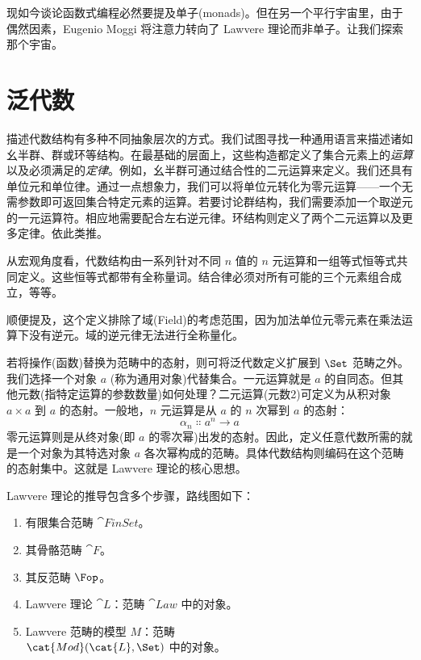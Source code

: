 
\lettrine[lhang=0.17]{现}{如今}谈论函数式编程必然要提及单子(monads)。但在另一个平行宇宙里，由于偶然因素，Eugenio Moggi 将注意力转向了 Lawvere 理论而非单子。让我们探索那个宇宙。

\section{泛代数}

描述代数结构有多种不同抽象层次的方式。我们试图寻找一种通用语言来描述诸如幺半群、群或环等结构。在最基础的层面上，这些构造都定义了集合元素上的\emph{运算}以及必须满足的\emph{定律}。例如，幺半群可通过结合性的二元运算来定义。我们还具有单位元和单位律。通过一点想象力，我们可以将单位元转化为零元运算——一个无需参数即可返回集合特定元素的运算。若要讨论群结构，我们需要添加一个取逆元的一元运算符。相应地需要配合左右逆元律。环结构则定义了两个二元运算以及更多定律。依此类推。

从宏观角度看，代数结构由一系列针对不同 $n$ 值的 $n$ 元运算和一组等式恒等式共同定义。这些恒等式都带有全称量词。结合律必须对所有可能的三个元素组合成立，等等。

顺便提及，这个定义排除了域(Field)的考虑范围，因为加法单位元零元素在乘法运算下没有逆元。域的逆元律无法进行全称量化。

若将操作(函数)替换为范畴中的态射，则可将泛代数定义扩展到 $\Set$ 范畴之外。我们选择一个对象 $a$ (称为通用对象)代替集合。一元运算就是 $a$ 的自同态。但其他元数(指特定运算的参数数量)如何处理？二元运算(元数2)可定义为从积对象 $a\times{}a$ 到 $a$ 的态射。一般地，$n$ 元运算是从 $a$ 的 $n$ 次幂到 $a$ 的态射：
$$\alpha_n \Colon a^n \to a$$
零元运算则是从终对象(即 $a$ 的零次幂)出发的态射。因此，定义任意代数所需的就是一个对象为其特选对象 $a$ 各次幂构成的范畴。具体代数结构则编码在这个范畴的态射集中。这就是 Lawvere 理论的核心思想。

Lawvere 理论的推导包含多个步骤，路线图如下：

\begin{enumerate}
  \tightlist
  \item
        有限集合范畴 $\cat{FinSet}$。
  \item
        其骨骼范畴 $\cat{F}$。
  \item
        其反范畴 $\Fop$。
  \item
        Lawvere 理论 $\cat{L}$：范畴 $\cat{Law}$ 中的对象。
  \item
        Lawvere 范畴的模型 $M$：范畴\\
        $\cat{Mod}(\cat{L}, \Set)$ 中的对象。
\end{enumerate}

